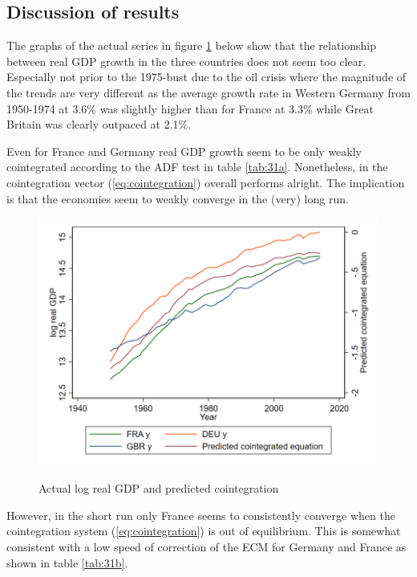 \subsection{Discussion of results}
The graphs of the actual series in figure \ref{fig:33} below show that the relationship between real GDP growth in the three countries does not seem too clear. Especially not prior to the 1975-bust due to the oil crisis where the magnitude of the trends are very different as the average growth rate in Western Germany from 1950-1974 at 3.6\% was slightly higher than for France at 3.3\% while Great Britain was clearly outpaced at 2.1\%.

Even for France and Germany real GDP growth seem to be only weakly cointegrated according to the ADF test in table \ref{tab:31a}. Nonetheless, in the cointegration vector (\ref{eq:cointegration}) overall performs alright. The implication is that the economies seem to weakly converge in the (very) long run.
\begin{figure}[H]
  \caption{Actual log real GDP and predicted cointegration}
    \includegraphics[width= \textwidth]{03_figures/fig33}
  \label{fig:33}
  \vspace{-.5cm}
\end{figure}\noindent
However, in the short run only France seems to consistently converge when the cointegration system (\ref{eq:cointegration}) is out of equilibrium. This is somewhat consistent with a low speed of correction of the ECM for Germany and France as shown in table \ref{tab:31b}.

